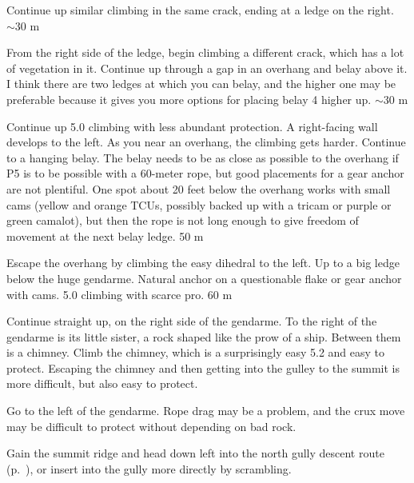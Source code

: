 \documentclass{tahquitz}
\begin{document}
 Continue up similar climbing in the same crack,
ending at a ledge on the right.  $\sim 30$ m

 From the right side of the ledge, begin climbing a
different crack, which has a lot of vegetation in it.
Continue up through a gap in an overhang and belay above it.
I think there are two ledges at which you can belay, and the higher one
may be preferable because it gives you more options for placing belay
4 higher up. $\sim 30$ m

 Continue up 5.0 climbing with less abundant protection.  A
right-facing wall develops to the left.  As you near an overhang, the
climbing gets harder.  Continue to a hanging belay. The belay needs to
be as close as possible to the overhang if P5 is to be possible with a
60-meter rope, but good placements for a gear anchor are not
plentiful. One spot about 20 feet below the overhang works with small
cams (yellow and orange TCUs, possibly backed up with a tricam or
purple or green camalot), but then the rope is not long enough to give
freedom of movement at the next belay ledge. 50 m

 Escape the overhang by climbing the easy dihedral to the left.
Up to a big ledge below the huge gendarme. Natural anchor on a questionable
flake or gear anchor with cams. 5.0 climbing with scarce pro.
60 m

 Continue straight up, on the right side of the gendarme.  To
the right of the gendarme is its little sister, a rock shaped like the
prow of a ship. Between them is a chimney. Climb the chimney, which is
a surprisingly easy 5.2 and easy to protect. Escaping the chimney and
then getting into the gulley to the summit is more difficult, but also
easy to protect.

 Go to the left of the gendarme.
Rope drag may be a problem, and the crux move may be difficult to protect
without depending on bad rock.

\somespace

\descent Gain the summit ridge and head down left into the north gully descent route (p.~\pageref{subsec:north-gully-descent}),
or insert into the gully more directly by scrambling.




\end{document}
